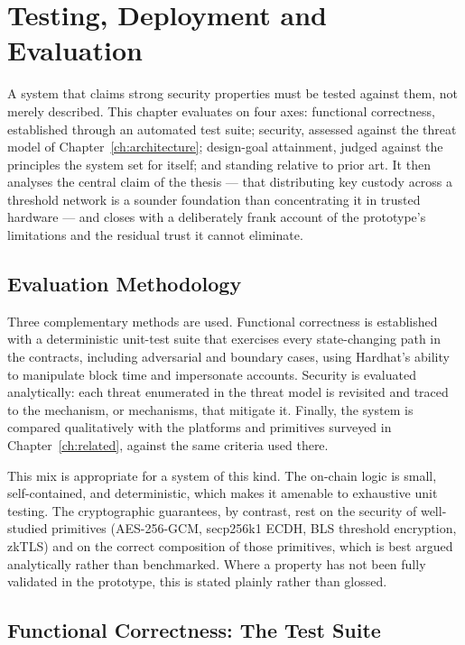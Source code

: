 \chapter{Testing, Deployment and Evaluation}
\label{ch:evaluation}

A system that claims strong security properties must be tested against them, not
merely described. This chapter evaluates \zkw on four axes: functional correctness,
established through an automated test suite; security, assessed against the threat
model of Chapter~\ref{ch:architecture}; design-goal attainment, judged against the
principles the system set for itself; and standing relative to prior art. It then
analyses the central claim of the thesis --- that distributing key custody across a
threshold network is a sounder foundation than concentrating it in trusted
hardware --- and closes with a deliberately frank account of the prototype's
limitations and the residual trust it cannot eliminate.

\section{Evaluation Methodology}
\label{sec:eval-method}

Three complementary methods are used. Functional correctness is established with a
deterministic unit-test suite that exercises every state-changing path in the
contracts, including adversarial and boundary cases, using Hardhat's ability to
manipulate block time and impersonate accounts. Security is evaluated analytically:
each threat enumerated in the threat model is revisited and traced to the
mechanism, or mechanisms, that mitigate it. Finally, the system is compared
qualitatively with the platforms and primitives surveyed in
Chapter~\ref{ch:related}, against the same criteria used there.

This mix is appropriate for a system of this kind. The on-chain logic is small,
self-contained, and deterministic, which makes it amenable to exhaustive unit
testing. The cryptographic guarantees, by contrast, rest on the security of
well-studied primitives (AES-256-GCM, secp256k1 ECDH, BLS threshold encryption,
zkTLS) and on the correct composition of those primitives, which is best argued
analytically rather than benchmarked. Where a property has not been fully
validated in the prototype, this is stated plainly rather than glossed.

\section{Functional Correctness: The Test Suite}
\label{sec:eval-tests}


